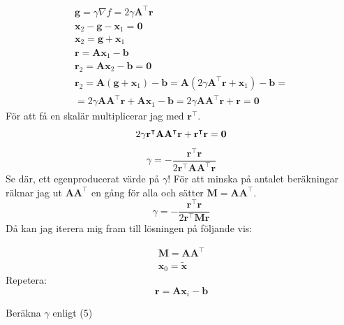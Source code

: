 \documentclass{article}
\begin{document}
\begin{gather*}
     \mathbf{g} = \gamma \nabla f = 2 \gamma \mathbf{A}^\intercal \mathbf{r}\\
     \mathbf{x}_2 - \mathbf{g} - \mathbf{x}_1 = \mathbf{0} \\ 
     \mathbf{x}_2 = \mathbf{g} + \mathbf{x}_1 \\
     \mathbf{r} = \mathbf{Ax}_1 - \mathbf{b}  \\
     \mathbf{r}_2 = \mathbf{Ax}_2 - \mathbf{b} = \mathbf{0} \\
     \mathbf{r}_2 = \mathbf{A}(\mathbf{g} + \mathbf{x}_1) - \mathbf{b} =
     \mathbf{A}(2 \gamma \mathbf{A}^\intercal \mathbf{r} + \mathbf{x}_1) - \mathbf{b} = \\
     = 2 \gamma \mathbf{A} \mathbf{A}^\intercal \mathbf{r} + \mathbf{A} \mathbf{x}_1 - \mathbf{b} = 
     2 \gamma \mathbf{A} \mathbf{A}^\intercal \mathbf{r} + \mathbf{r} = \mathbf{0}
 \end{gather*}
 För att få en skalär multiplicerar jag med $\mathbf{r}^\intercal$.
 \begin{equation*}
     2 \gamma \mathbf{r}^\intercal \mathbf{A} \mathbf{A}^\intercal \mathbf{r} + \mathbf{r}^\intercal \mathbf{r} = \mathbf{0} \\
 \end{equation*}
 \begin{equation}
     \gamma = - \frac{\mathbf{r}^\intercal \mathbf{r}}{2 \mathbf{r}^\intercal \mathbf{A} \mathbf{A}^\intercal \mathbf{r}}
 \end{equation}
 Se där, ett egenproducerat värde på $\gamma$! För att minska på antalet beräkningar räknar jag ut
 $\mathbf{A}\mathbf{A}^\intercal$ en gång för alla och sätter $\mathbf{M}=\mathbf{A}\mathbf{A}^\intercal$.
 \begin{equation}
     \gamma = - \frac{\mathbf{r}^\intercal \mathbf{r}}{2 \mathbf{r}^\intercal \mathbf{M} \mathbf{r}}
 \end{equation}
 Då kan jag iterera mig fram till lösningen på följande vis:

 \begin{gather*}
    \mathbf{M}=\mathbf{A}\mathbf{A}^\intercal\\
    \mathbf{x}_0 = \mathbf{\tilde{x} }
\end{gather*}
Repetera:
\begin{equation*}
    \mathbf{r} = \mathbf{A}\mathbf{x}_i - \mathbf{b}
\end{equation*}

    Beräkna $\gamma $ enligt (5)
\end{document}
